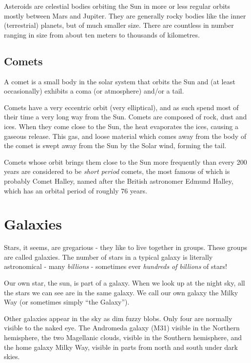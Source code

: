 Asteroids are celestial bodies orbiting the Sun in more or less regular
orbits mostly between Mars and Jupiter. They are generally rocky bodies
like the inner (terrestrial) planets, but of much smaller size. There
are countless in number ranging in size from about ten meters to
thousands of kilometres.

\subsection{Comets}\label{comets}

A comet is a small body in the solar system that orbits the Sun and (at
least occasionally) exhibits a coma (or atmosphere) and/or a tail.

Comets have a very eccentric orbit (very elliptical), and as such spend
most of their time a very long way from the Sun. Comets are composed of
rock, dust and ices. When they come close to the Sun, the heat
evaporates the ices, causing a gaseous release. This gas, and loose
material which comes away from the body of the comet is swept away from
the Sun by the Solar wind, forming the tail.

Comets whose orbit brings them close to the Sun more frequently than
every 200 years are considered to be \emph{short period} comets, the
most famous of which is probably Comet Halley, named after the British
astronomer Edmund Halley, which has an orbital period of roughly 76
years.

\section{Galaxies}\label{galaxies}

Stars, it seems, are gregarious - they like to live together in groups.
These groups are called galaxies. The number of stars in a typical
galaxy is literally astronomical - many \emph{billions} - sometimes ever
\emph{hundreds of billions} of stars!

Our own star, the sun, is part of a galaxy. When we look up at the night
sky, all the stars we can see are in the same galaxy. We call our own
galaxy the Milky Way (or sometimes simply ``the Galaxy'').

Other galaxies appear in the sky as dim fuzzy blobs. Only four are
normally visible to the naked eye. The Andromeda galaxy (M31) visible in
the Northern hemisphere, the two Magellanic clouds, visible in the
Southern hemisphere, and the home galaxy Milky Way, visible in parts
from north and south under dark skies.

